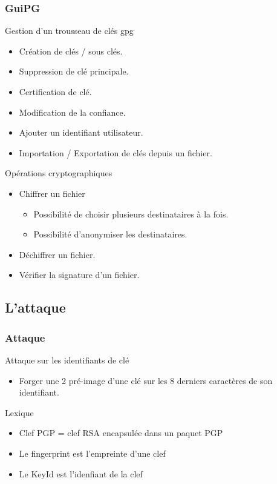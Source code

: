 \begin{frame}
  \frametitle{\color{white}GuiPG}
  \begin{block}{Gestion d'un trousseau de clés gpg}
      \begin{itemize}
        \item Création de clés / sous clés.
        \item Suppression de clé principale.
        \item Certification de clé.
        \item Modification de la confiance.
        \item Ajouter un identifiant utilisateur.
        \item Importation / Exportation de clés depuis un fichier.
      \end{itemize}
    \end{block}
    \begin{block}{Opérations cryptographiques}
      \begin{itemize}
        \item Chiffrer un fichier
	  \begin{itemize}
	   \item Possibilité de choisir plusieurs destinataires à la fois.
	   \item Possibilité d'anonymiser les destinataires.
	  \end{itemize}
        \item Déchiffrer un fichier.
        \item Vérifier la signature d'un fichier.
      \end{itemize}
    \end{block}
\end{frame}

\subsection{L'attaque}
\begin{frame}
  \frametitle{\color{white}Attaque}
  \begin{block}{Attaque sur les identifiants de clé}
      \begin{itemize}
        \item Forger une 2 pré-image d'une clé sur les 8 derniers caractères de son identifiant.
      \end{itemize}
    \end{block}
  \begin{block}{Lexique}
      \begin{itemize}
        \item Clef PGP = clef RSA encapsulée dans un paquet PGP
        \item Le fingerprint est l'empreinte d'une clef
        \item Le KeyId est l'idenfiant de la clef
      \end{itemize}
    \end{block}
\end{frame}

